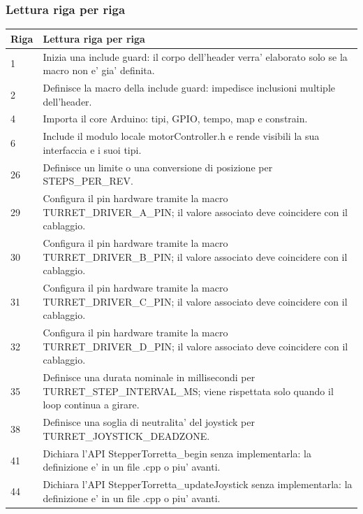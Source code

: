 \documentclass[11pt,a4paper]{article}
\begin{document}
\subsubsection{Lettura riga per riga}
\begin{longtable}{p{}p{}}
\toprule
\textbf{Riga} & \textbf{Lettura riga per riga} \\
\midrule
\endhead
1 & Inizia una include guard: il corpo dell'header verra' elaborato solo se la macro non e' gia' definita. \\
2 & Definisce la macro della include guard: impedisce inclusioni multiple dell'header. \\
4 & Importa il core Arduino: tipi, GPIO, tempo, map e constrain. \\
6 & Include il modulo locale motorController.h e rende visibili la sua interfaccia e i suoi tipi. \\
26 & Definisce un limite o una conversione di posizione per STEPS\_\allowbreak{}PER\_\allowbreak{}REV. \\
29 & Configura il pin hardware tramite la macro TURRET\_\allowbreak{}DRIVER\_\allowbreak{}A\_\allowbreak{}PIN; il valore associato deve coincidere con il cablaggio. \\
30 & Configura il pin hardware tramite la macro TURRET\_\allowbreak{}DRIVER\_\allowbreak{}B\_\allowbreak{}PIN; il valore associato deve coincidere con il cablaggio. \\
31 & Configura il pin hardware tramite la macro TURRET\_\allowbreak{}DRIVER\_\allowbreak{}C\_\allowbreak{}PIN; il valore associato deve coincidere con il cablaggio. \\
32 & Configura il pin hardware tramite la macro TURRET\_\allowbreak{}DRIVER\_\allowbreak{}D\_\allowbreak{}PIN; il valore associato deve coincidere con il cablaggio. \\
35 & Definisce una durata nominale in millisecondi per TURRET\_\allowbreak{}STEP\_\allowbreak{}INTERVAL\_\allowbreak{}MS; viene rispettata solo quando il loop continua a girare. \\
38 & Definisce una soglia di neutralita' del joystick per TURRET\_\allowbreak{}JOYSTICK\_\allowbreak{}DEADZONE. \\
41 & Dichiara l'API StepperTorretta\_\allowbreak{}begin senza implementarla: la definizione e' in un file .cpp o piu' avanti. \\
44 & Dichiara l'API StepperTorretta\_\allowbreak{}updateJoystick senza implementarla: la definizione e' in un file .cpp o piu' avanti. \\

\end{longtable}
\end{document}

